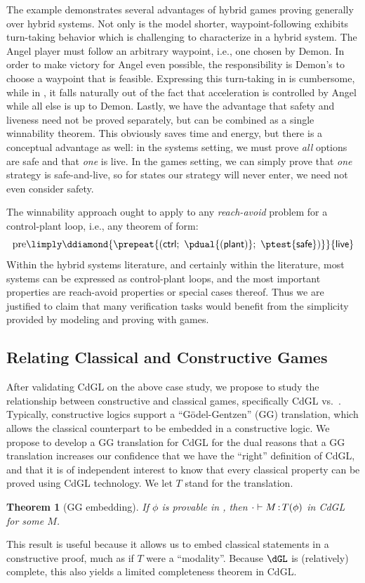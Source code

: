 \documentclass[12pt]{cmuthesis}
\newtheorem{theorem}{Theorem}
\theoremstyle{definition}
\theoremstyle{remark}
\newcommand{\ctrl}{\textsf{ctrl}\xspace}
\newcommand{\plant}{\textsf{plant}\xspace}
\newcommand{\rref}[2][]{\prettyref{#2}}
\newcommand{\CdGL}{\textsf{CdGL}\xspace}
\begin{document}
The example demonstrates several advantages of hybrid games proving generally over hybrid systems.
Not only is the model shorter, waypoint-following exhibits turn-taking behavior which is challenging to characterize in a hybrid system.
The Angel player must follow an arbitrary waypoint, i.e., one chosen by Demon.
In order to make victory for Angel even possible, the responsibility is Demon's to choose a waypoint that is feasible.
Expressing this turn-taking in \rref{thm:live} is cumbersome, while in \rref{thm:angel-wins-gen}, it falls naturally out of the fact that acceleration is controlled by Angel while all else is up to Demon.
Lastly, we have the advantage that safety and liveness need not be proved separately, but can be combined as a single winnability theorem.
This obviously saves time and energy, but there is a conceptual advantage as well: in the systems setting, we must prove \emph{all} options are safe and that \emph{one} is live.
In the games setting, we can simply prove that \emph{one} strategy is safe-and-live, so for states our strategy will never enter, we need not even consider safety.

The winnability approach ought to apply to any \emph{reach-avoid} problem for a control-plant loop, i.e., any theorem of form:
\[\text{pre} \limply \ddiamond{\prepeat{(\ctrl;~\pdual{(\plant)};~\ptest{\textsf{safe}})}}{\textsf{live}}\]
Within the hybrid systems literature, and certainly within the \dL literature, most systems can be expressed as control-plant loops, and the most important properties are reach-avoid properties or special cases thereof.
Thus we are justified to claim that many verification tasks would benefit from the simplicity provided by modeling and proving with games.

\subsection{Relating Classical and Constructive Games}
After validating \CdGL on the above case study, we propose to study the relationship between constructive and classical games, specifically \CdGL vs.\ \dGL.
Typically, constructive logics support a ``G\"{o}del-Gentzen'' (GG) translation, which allows the classical counterpart to be embedded in a constructive logic.
We propose to develop a GG translation for \CdGL for the dual reasons that a GG translation increases our confidence that we have the ``right'' definition of \CdGL, and that it is of independent interest to know that every classical \dGL property can be proved using \CdGL technology.
We let $T$ stand for the translation.
\begin{theorem}[GG embedding]
  If $\phi$ is provable in \dGL, then $\cdot\allowbreak\vdash M \allowbreak \mathop{:} T(\phi)$ in \CdGL for some $M$.
\end{theorem}
This result is useful because it allows us to embed classical statements in a constructive proof, much as if $T$ were a ``modality''.
Because $\dGL$ is (relatively) complete, this also yields a limited completeness theorem in \CdGL.
\end{document}
